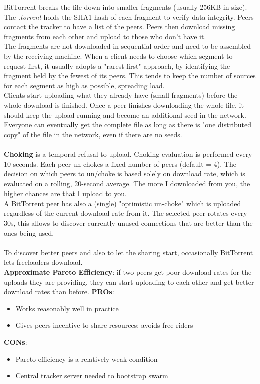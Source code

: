 \documentclass[10pt,a4paper]{article}
\begin{document}
BitTorrent breaks the file down into smaller fragments (usually 256KB in size). The \textit{.torrent} holds the SHA1 hash of each fragment to verify data integrity. Peers contact the tracker to have a list of the peers. Peers then download missing fragments from each other and upload to those who don't have it. \\ The fragments are not downloaded in sequential order and need to be assembled by the receiving machine. When a client needs to choose which segment to request first, it usually adopts a "rarest-first" approach, by identifying the fragment held by the fewest of its peers. This tends to keep the number of sources for each segment as high as possible, spreading load. \\
Clients start uploading what they already have (small fragments) before the whole download is finished. Once a peer finishes downloading the whole file, it should keep the upload running and become an additional seed in the network. Everyone can eventually get the complete file as long as there is "one distributed copy" of the file in the network, even if there are no seeds. \\ \\
\textbf{Choking} is a temporal refusal to upload. Choking evaluation is performed every 10 seconds. Each peer un-chokes a fixed number of peers (default = 4). The decision on which peers to un/choke is based solely on download rate, which is evaluated on a rolling, 20-second average. The more I downloaded from you, the higher chances are that I upload to you. \\ A BitTorrent peer has also a (single) "optimistic un-choke" which is uploaded regardless of the current download rate from it. The selected peer rotates every 30s, this allows to discover currently unused connections that are better than the ones being used. \\ \\
To discover better peers and also to let the sharing start, occasionally BitTorrent lets freeloaders download. \\
\textbf{Approximate Pareto Efficiency}: if two peers get poor download rates for the uploads they are providing, they can start uploading to each other and get better download rates than before.
\textbf{PROs}:
\begin{itemize}
	\item Works reasonably well in practice
	\item Gives peers incentive to share resources; avoids free-riders
\end{itemize}
\textbf{CONs}:
\begin{itemize}
	\item Pareto efficiency is a relatively weak condition
	\item Central tracker server needed to bootstrap swarm
\end{itemize}
\end{document}
